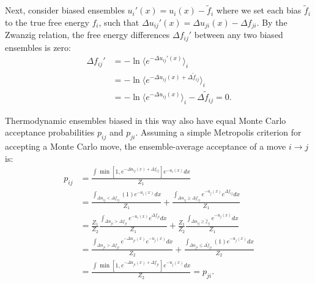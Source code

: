 \documentclass[%
 aip,
rsi,%
 amsmath,amssymb,
 reprint,%
]{revtex4-1}
\begin{document}
Next, consider biased ensembles $u_i'(x) = u_i(x) - \tilde{f}_i$ where we set each bias $\tilde{f}_i$ to the true free energy $f_i$, such that $\Delta u_{ij}'(x) = \Delta u_{ji}(x) - \Delta f_{ji}$.  By the Zwanzig relation, the free energy differences $\Delta f_{ij}'$ between any two biased ensembles is zero:
\begin{align}
    \Delta f_{ij}' &= - \ln \langle e^{-\Delta u_{ij}'(x)} \rangle_i \\
    &= - \ln \langle e^{-\Delta u_{ij}(x)  + \Delta \tilde{f}_{ij} } \rangle_i \\
    &= - \ln \langle e^{-\Delta u_{ij}(x)}\rangle_i - \Delta \tilde{f}_{ij}  = 0.
\end{align}

Thermodynamic ensembles biased in this way also have equal Monte Carlo acceptance probabilities $p_{ij}$ and $p_{ji}$.  Assuming a simple Metropolis criterion for accepting a Monte Carlo move, the ensemble-average acceptance of a move $i \rightarrow j$ is:
\begin{align}
    p_{ij} &= \frac{ \int \min [ 1, e^{-\Delta u_{ij}(x) + \Delta f_{ij} } ] e^{-u_i(x)} dx} {Z_1} \\
    &= \frac{\int_{\Delta u_{ij} < \Delta f_{ij} } (1) e^{-u_i(x)} dx}{Z_1} + \frac{\int_{\Delta u_{ij} \geq \Delta f_{ij} } e^{-u_j(x)} e^{\Delta f_{ij}} dx}{Z_1} \\
    &=  \frac{Z_1}{Z_2} \frac{\int_{\Delta u_{ji} > \Delta f_{ji} } e^{-u_i(x)} e^{\Delta f_{ji}} dx}{Z_1} + \frac{Z_1}{Z_2} \frac{\int_{\Delta u_{ij} \geq \tilde{f}_{ij} } e^{-u_j(x)} dx}{Z_1} \\
    &=  \frac{\int_{\Delta u_{ji} > \Delta f_{ji} } e^{-\Delta u_{ji}(x)} e^{-u_j(x)} dx}{Z_2} + \frac{\int_{\Delta u_{ji} \leq \Delta \tilde{f}_{ji} } (1) e^{-u_j(x)} dx}{Z_2} \\
    &= \frac{ \int \min [ 1, e^{-\Delta u_{ji}(x) + \Delta f_{ji} } ] e^{-u_j(x)} dx} {Z_2} = p_{ji}. \\
\end{align}




\newpage


\end{document}
